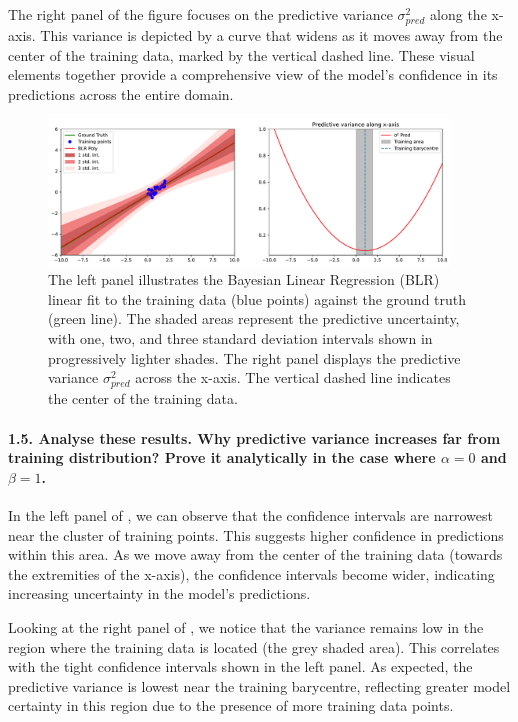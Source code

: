 The right panel of the figure focuses on the predictive variance \( \sigma ^2_{pred}  \) along the x-axis. This variance is depicted by a curve that widens as it moves away from the center of the training data, marked by the vertical dashed line. These visual elements together provide a comprehensive view of the model's confidence in its predictions across the entire domain.
\begin{figure}[H]
    \centering
    \includegraphics[width=0.95\textwidth]{phi_linear.pdf}
    \caption{The left panel illustrates the Bayesian Linear Regression (BLR) linear fit to the training data (blue points) against the ground truth (green line). The shaded areas represent the predictive uncertainty, with one, two, and three standard deviation intervals shown in progressively lighter shades. The right panel displays the predictive variance $\sigma ^2_{pred} $ across the x-axis. The vertical dashed line indicates the center of the training data.}
    \label{fig:phi_linear}
\end{figure}

\paragraph*{1.5. Analyse these results. Why predictive variance increases far from training distribution? Prove it analytically in the case where $\alpha=0$ and $\beta=1$.}

In the left panel of , we can observe that the confidence intervals are narrowest near the cluster of training points. This suggests higher confidence in predictions within this area. As we move away from the center of the training data (towards the extremities of the x-axis), the confidence intervals become wider, indicating increasing uncertainty in the model's predictions.

Looking at the right panel of , we notice that the variance remains low in the region where the training data is located (the grey shaded area). This correlates with the tight confidence intervals shown in the left panel. As expected, the predictive variance is lowest near the training barycentre, reflecting greater model certainty in this region due to the presence of more training data points.


